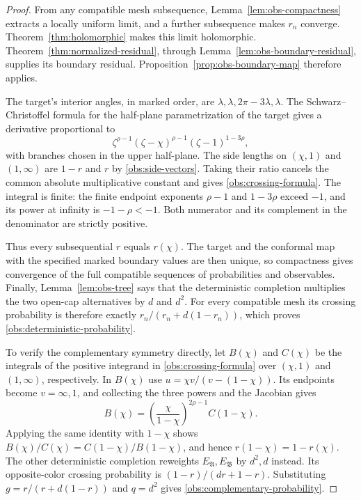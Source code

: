 \begin{proof}
From any compatible mesh subsequence, Lemma~\ref{lem:obs-compactness}
extracts a locally uniform limit, and a further subsequence makes
$r_n$ converge.  Theorem~\ref{thm:holomorphic} makes this limit
holomorphic.  Theorem~\ref{thm:normalized-residual}, through
Lemma~\ref{lem:obs-boundary-residual}, supplies its boundary
residual.  Proposition~\ref{prop:obs-boundary-map} therefore applies.

The target's interior angles, in marked order, are
$\lambda,\lambda,2\pi-3\lambda,\lambda$.
The Schwarz--Christoffel formula for the half-plane parametrization
of the target gives a derivative proportional to
\begin{equation}
 \zeta^{\rho-1}(\zeta-\chi)^{\rho-1}
       (\zeta-1)^{1-3\rho},
 \label{obs:sc-derivative}
\end{equation}
with branches chosen in the upper half-plane.  The side lengths
on $(\chi,1)$ and $(1,\infty)$ are $1-r$ and $r$ by
\eqref{obs:side-vectors}.  Taking their ratio cancels the common
absolute multiplicative constant and gives
\eqref{obs:crossing-formula}.  The integral is finite: the finite
endpoint exponents $\rho-1$ and $1-3\rho$ exceed $-1$, and its
power at infinity is $-1-\rho<-1$.  Both numerator and its
complement in the denominator are strictly positive.

Thus every subsequential $r$ equals $r(\chi)$.  The target and
the conformal map with the specified marked boundary values are
then unique, so compactness gives convergence of the full compatible
sequences of probabilities and observables.  Finally,
Lemma~\ref{lem:obs-tree} says that the deterministic completion
multiplies the two open-cap alternatives by $d$ and $d^2$.
For every compatible mesh its crossing probability is therefore
exactly
$r_n/(r_n+d(1-r_n))$, which proves
\eqref{obs:deterministic-probability}.

To verify the complementary symmetry directly, let $B(\chi)$ and
$C(\chi)$ be the integrals of the positive integrand in
\eqref{obs:crossing-formula} over $(\chi,1)$ and $(1,\infty)$,
respectively.  In $B(\chi)$ use
$u=\chi v/(v-(1-\chi))$.  Its endpoints become $v=\infty,1$,
and collecting the three powers and the Jacobian gives
\begin{equation}
 B(\chi)=\left(\frac{\chi}{1-\chi}\right)^{2\rho-1}C(1-\chi).
 \label{obs:complementary-integrals}
\end{equation}
Applying the same identity with $1-\chi$ shows
$B(\chi)/C(\chi)=C(1-\chi)/B(1-\chi)$, and hence
$r(1-\chi)=1-r(\chi)$.  The other deterministic completion
reweights $E_{\mathfrak A},E_{\mathfrak B}$ by $d^2,d$ instead.
Its opposite-color crossing probability is $(1-r)/(dr+1-r)$.
Substituting $g=r/(r+d(1-r))$ and $q=d^2$ gives
\eqref{obs:complementary-probability}.
\end{proof}

